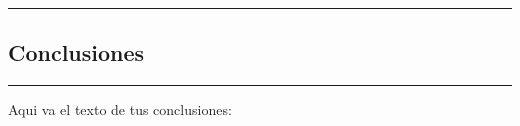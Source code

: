 {\color{gray}\hrule}
\begin{center}
\section{Conclusiones}
\end{center}
{\color{gray}\hrule}

\vspace{0.5cm}
Aqui va el texto de tus conclusiones:
\lipsum[1-2]